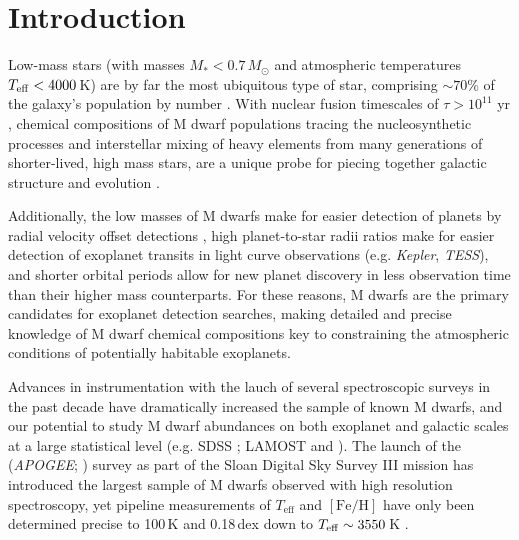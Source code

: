 \documentclass[modern]{aastex62}
\newcommand{\apogee}{\textsl{APOGEE}}
\newcommand{\kepler}{\textsl{Kepler}}
\newcommand{\tess}{\textsl{TESS}}
\newcommand{\msun}{M_{\odot}}
\newcommand{\teff}{T_{\mathrm{eff}}}
\newcommand{\feh}{[{\mathrm{Fe}/\mathrm{H}}]}
\begin{document}
 
\section{Introduction} \label{sec:intro}

Low-mass stars (with masses $M_{*} < 0.7\,\msun$ and atmospheric temperatures $T_{\rm eff} < 4000\,$K) are by far the most ubiquitous type of star, comprising $\sim 70 \%$ of the galaxy's population by number \citep{Bochanski:2010}. With nuclear fusion timescales of $\tau>10^{11}$ yr \citep{Laughlin:1997}, chemical compositions of M dwarf populations tracing the nucleosynthetic processes and interstellar mixing of heavy elements from many generations of shorter-lived, high mass stars, are a unique probe for piecing together galactic structure and evolution \citep{Bochanski:2010}.  

Additionally, the low masses of M dwarfs make for easier detection of planets by radial velocity offset detections \citep{Trifonov:2018}, high planet-to-star radii ratios make for easier detection of exoplanet transits in light curve observations (e.g. \kepler, \tess), and shorter orbital periods allow for new planet discovery in less observation time than their higher mass counterparts. For these reasons, M dwarfs are the primary candidates for exoplanet detection searches, making detailed and precise knowledge of M dwarf chemical compositions key to constraining the atmospheric conditions of potentially habitable exoplanets. 

Advances in instrumentation with the lauch of several spectroscopic surveys in the past decade have dramatically increased the sample of known M dwarfs, and our potential to study M dwarf abundances on both exoplanet and galactic scales at a large statistical level (e.g. SDSS \citealt{West:2011}; LAMOST \citealt{Yi:2014} and \citealt{Guo:2015}).
The launch of the (\apogee; \citealt{Majewski:2015}) survey as part of the Sloan Digital Sky Survey III mission \citep{Eisenstein:2011} has introduced the largest sample of M dwarfs observed with high resolution spectroscopy, yet pipeline measurements \citep{Perez:2016} of $\teff$ and $\feh$ have only been determined precise to 100\,K and 0.18\,dex down to $T_{\rm eff}\sim3550\,$K \citep{Schmidt:2016}.
\end{document}

